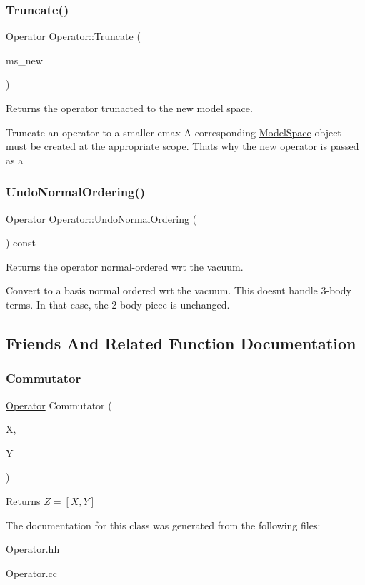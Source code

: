 \subsubsection{\texorpdfstring{Truncate()}{Truncate()}}
{\footnotesize\ttfamily \hyperlink{classOperator}{Operator} Operator\+::\+Truncate (\begin{DoxyParamCaption}\item[{\hyperlink{classModelSpace}{Model\+Space} \&}]{ms\+\_\+new }\end{DoxyParamCaption})}



Returns the operator trunacted to the new model space. 

Truncate an operator to a smaller emax A corresponding \hyperlink{classModelSpace}{Model\+Space} object must be created at the appropriate scope. That\textquotesingle{}s why the new operator is passed as a \mbox{\label{classOperator_a24a5d005bdf2d04d4cdb6f009a901eca}} 
\subsubsection{\texorpdfstring{Undo\+Normal\+Ordering()}{UndoNormalOrdering()}}
{\footnotesize\ttfamily \hyperlink{classOperator}{Operator} Operator\+::\+Undo\+Normal\+Ordering (\begin{DoxyParamCaption}{ }\end{DoxyParamCaption}) const}



Returns the operator normal-\/ordered wrt the vacuum. 

Convert to a basis normal ordered wrt the vacuum. This doesn\textquotesingle{}t handle 3-\/body terms. In that case, the 2-\/body piece is unchanged. 

\subsection{Friends And Related Function Documentation}
\mbox{\label{classOperator_a88b0cafa371bca287379a0ce89627e2b}} 
\subsubsection{\texorpdfstring{Commutator}{Commutator}}
{\footnotesize\ttfamily \hyperlink{classOperator}{Operator} Commutator (\begin{DoxyParamCaption}\item[{const \hyperlink{classOperator}{Operator} \&}]{X,  }\item[{const \hyperlink{classOperator}{Operator} \&}]{Y }\end{DoxyParamCaption})\hspace{0.3cm}{\ttfamily [friend]}}

Returns $ Z = [X,Y] $ 

The documentation for this class was generated from the following files\+:\begin{DoxyCompactItemize}
\item 
Operator.\+hh\item 
Operator.\+cc\end{DoxyCompactItemize}
